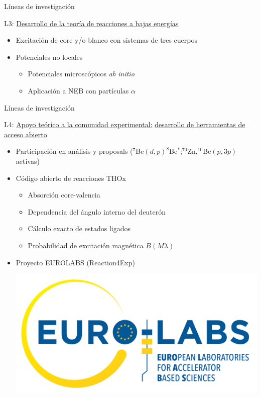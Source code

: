 \documentclass{beamer}
\begin{document}
\begin{frame}{Líneas de investigación} 

\large {}  L3: \underline{Desarrollo de la teoría de reacciones a bajas energías} 

\normalsize
    
\begin{itemize}
\item Excitación de core y/o blanco con sistemas de tres cuerpos
\item Potenciales no locales
\begin{itemize}
\item Potenciales microscópicos \textit{ab initio}
\item Aplicación a NEB con partículas $\alpha$
\end{itemize}


\end{itemize}    
    
\end{frame}

\begin{frame}{Líneas de investigación} 

\large {}  L4: \underline{Apoyo teórico a la comunidad experimental:} \underline{desarrollo de herramientas de acceso abierto} 

\normalsize
    
\begin{itemize}
\item Participación en análisis y proposals ($^7$Be$(d,p)^8$Be$^*$;$^{70}$Zn,$^{10}$Be$(p,3p)$ activas)
\item Código abierto de reacciones THOx
\begin{itemize}
\item Absorción core-valencia
\item Dependencia del ángulo interno del deuterón
\item Cálculo exacto de estados ligados
\item Probabilidad de excitación magnética $B(M\lambda)$
\end{itemize}

\item Proyecto EUROLABS (Reaction4Exp)

\includegraphics[height=0.2\textheight]{eurolabs.jpg}   

\end{itemize}    
    
\end{frame}
\end{document}
